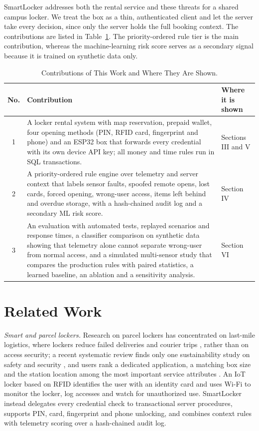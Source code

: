 \documentclass[journal,onecolumn]{IEEEtran}
\begin{document}
SmartLocker addresses both the rental service and these threats for a shared campus locker. We treat the box as a thin,
authenticated client and let the server take every decision, since only the server holds the full booking context.
The contributions are listed in Table~\ref{tab:contrib}. The priority-ordered rule tier is the main
contribution, whereas the machine-learning risk score serves as a secondary signal because it is trained on synthetic
data only.

\begin{table}[!htbp]
\renewcommand{\arraystretch}{1.02}
\centering
\small
\caption{Contributions of This Work and Where They Are Shown.}
\label{tab:contrib}
\vspace{5pt}
\begin{tabular}{c p{11.9cm} p{2.7cm}}
\hline
No. & Contribution & Where it is shown \\
\hline
\rule{0pt}{2.6ex}1 & A locker rental system with map reservation, prepaid wallet, four opening methods (PIN, RFID card, fingerprint and
    phone) and an ESP32 box that forwards every credential with its own device API key; all money and time rules run in SQL transactions. & Sections III and V \\
2 & A priority-ordered rule engine over telemetry and server context that labels sensor faults, spoofed remote opens,
    lost cards, forced opening, wrong-user access, items left behind and overdue storage, with a hash-chained audit log and a secondary ML risk score. & Section IV \\
3 & An evaluation with automated tests, replayed scenarios and response times, a classifier comparison on synthetic
    data showing that telemetry alone cannot separate wrong-user from normal access, and a simulated multi-sensor
    study that compares the production rules with paired statistics, a learned baseline, an ablation and a
    sensitivity analysis. & Section VI \\
\hline
\end{tabular}
\end{table}

\section{Related Work}

\textit{Smart and parcel lockers.} Research on parcel lockers has concentrated on last-mile logistics, where lockers
reduce failed deliveries and courier trips \cite{iwan2016parcel}, rather than on access security; a recent systematic
review finds only one sustainability study on safety and security \cite{zhang2025parcel}, and users rank a dedicated
application, a matching box size and the station location among the most important service attributes
\cite{ciesla2023parcel}. An IoT
locker based on RFID \cite{rfidiot2023locker} identifies the user with an identity card and uses Wi-Fi to monitor the
locker, log accesses and watch for unauthorized use. SmartLocker instead delegates every credential check to
transactional server procedures, supports PIN, card, fingerprint and phone unlocking, and combines context rules with
telemetry scoring over a hash-chained audit log.
\end{document}
